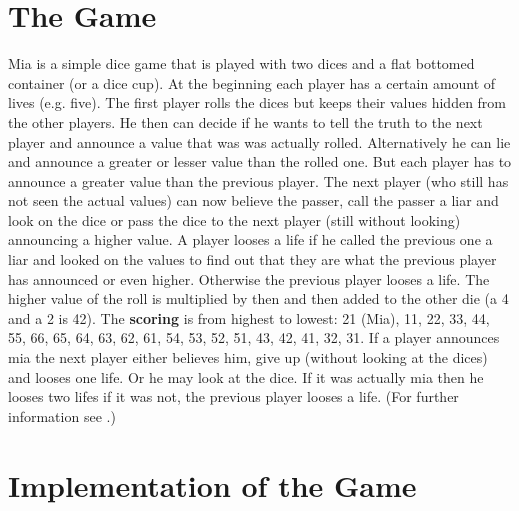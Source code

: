 \documentclass[11pt]{article}
\begin{document}
\section{The Game}
Mia is a simple dice game that is played with two dices and a flat bottomed container (or a dice cup). At the beginning each player has a certain amount of lives (e.g. five).
The first player rolls the dices but keeps their values hidden from the other players. He then can decide if he wants to tell the truth to the next player and announce a value that was was actually rolled. Alternatively he can lie and announce a greater or lesser value than the rolled one.
But each player has to announce a greater value than the previous player.
The next player (who still has not seen the actual values) can now believe the passer, call the passer a liar and look on the dice or pass the dice to the next player (still without looking) announcing a higher value. 
A player looses a life if he called the previous one a liar and looked on the values to find out that they are what the previous player has announced or even higher. Otherwise the previous player looses a life. 
The higher value of the roll is multiplied by then and then added to the other die (a 4 and a 2 is 42). 
The \textbf{scoring} is from highest to lowest:  21 (Mia), 11, 22, 33, 44, 55, 66, 65, 64, 63, 62, 61, 54, 53, 52, 51, 43, 42, 41, 32, 31.
If a player announces mia the next player either believes him, give up (without looking at the dices) and looses one life. Or he may look at the dice. If it was actually mia then he looses two lifes if it was not, the previous player looses a life. (For further information see \cite{mia:2016}.)

\section{Implementation of the Game}
\end{document}
